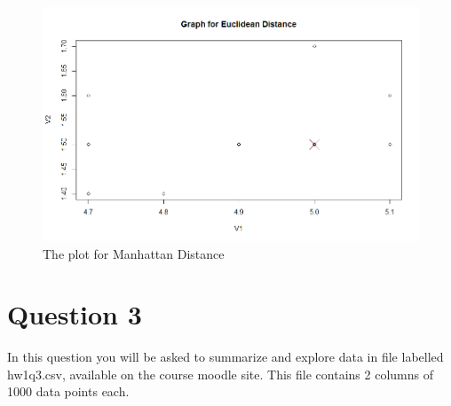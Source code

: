 \documentclass[fontsize=10pt]{scrartcl}
\begin{document}
\begin{enumerate}
\begin{enumerate}
\begin{verbatim}
\end{verbatim}
			\begin{figure}[H]
				\begin{center}
					\includegraphics[scale=.5]{resources/euclidean.png}
					\caption{The plot for Manhattan Distance}
				\end{center}
			\end{figure}


			\end{enumerate}
	\end{enumerate}

	\section{Question 3}

	In this question you will be asked to summarize and explore data in file labelled hw1q3.csv, available on the course moodle site. This file contains 2 columns of 1000 data points each.
\end{document}
